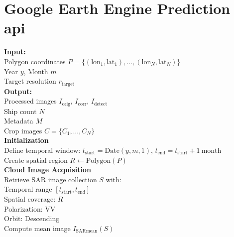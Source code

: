 \documentclass{article}
\begin{document}
	\newpage
	
	\section{Google Earth Engine Prediction \acrshort{api}}  \label{appendix:gee}
	
\begin{algorithm}[H]
	\caption{Google Earth Engine API Processing and Ship Detection}
	\label{alg:gee-ship-detection}
	
	\textbf{Input:} \\
	\hspace*{1em} Polygon coordinates $P = \{ (\mathrm{lon}_1, \mathrm{lat}_1), \ldots, (\mathrm{lon}_N, \mathrm{lat}_N) \}$ \\
	\hspace*{1em} Year $y$, Month $m$ \\
	\hspace*{1em} Target resolution $r_\mathrm{target}$ \\
	
	\textbf{Output:} \\
	\hspace*{1em} Processed images $I_\mathrm{orig}$, $I_\mathrm{corr}$, $I_\mathrm{detect}$ \\
	\hspace*{1em} Ship count $N$ \\
	\hspace*{1em} Metadata $M$ \\
	\hspace*{1em} Crop images $C = \{ C_1, \ldots, C_N \}$ \\
	
	\textbf{Initialization} \\
	\hspace*{1em} Define temporal window: $t_\mathrm{start} = \mathrm{Date}(y, m, 1)$, $t_\mathrm{end} = t_\mathrm{start} + 1~\text{month}$ \\
	\hspace*{1em} Create spatial region $R \leftarrow \mathrm{Polygon}(P)$ \\
	
	\textbf{Cloud Image Acquisition} \\
	\hspace*{1em} Retrieve SAR image collection $S$ with: \\
	\hspace*{2em} Temporal range $[t_\mathrm{start}, t_\mathrm{end}]$ \\
	\hspace*{2em} Spatial coverage: $R$ \\
	\hspace*{2em} Polarization: VV \\
	\hspace*{2em} Orbit: Descending \\
	\hspace*{1em} Compute mean image $I_\mathrm{SARmean}(S)$ \\
	

\end{algorithm}
\end{document}
